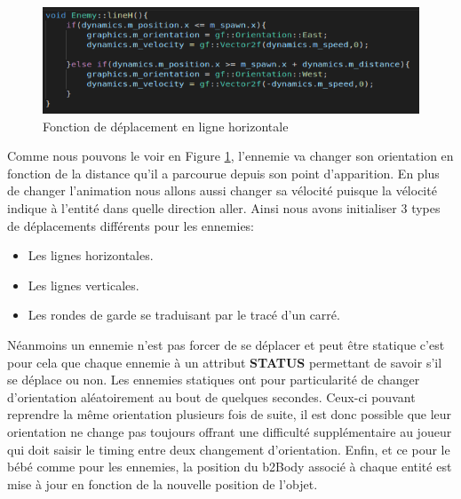 \documentclass{article}
\begin{document}
    \begin{figure}[ht]
        \begin{center}
            \includegraphics[width=1\textwidth]{images/screen_dep_ligne.png} 
        \end{center}
        \caption{Fonction de déplacement en ligne horizontale}
        \label{screen_fct_dep_ligne}
    \end{figure}

Comme nous pouvons le voir en Figure \ref{screen_fct_dep_ligne}, l'ennemie va changer son orientation en fonction de la distance qu'il a parcourue depuis son point d'apparition. En plus de changer l'animation nous allons aussi changer sa vélocité puisque la vélocité indique à l'entité dans quelle direction aller.\bigbreak
Ainsi nous avons initialiser 3 types de déplacements différents pour les ennemies:
    \begin{itemize}
        \item Les lignes horizontales.
        \item Les lignes verticales.
        \item Les rondes de garde se traduisant par le tracé d'un carré.
    \end{itemize}\bigbreak
Néanmoins un ennemie n'est pas forcer de se déplacer et peut être statique c'est pour cela que chaque ennemie à un attribut \textbf{STATUS} permettant de savoir s'il se déplace ou non. Les ennemies statiques ont pour particularité de changer d'orientation aléatoirement au bout de quelques secondes. Ceux-ci pouvant reprendre la même orientation plusieurs fois de suite, il est donc possible que leur orientation ne change pas toujours offrant une difficulté supplémentaire au joueur qui doit saisir le timing entre deux changement d'orientation.\bigbreak
Enfin, et ce pour le bébé comme pour les ennemies, la position du b2Body associé à chaque entité est mise à jour en fonction de la nouvelle position de l'objet.
\end{document}
